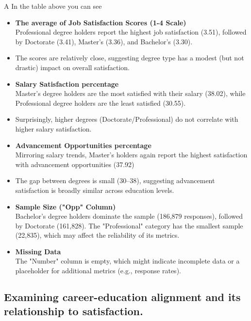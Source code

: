 \documentclass[12pt]{article}
\begin{document}
    A
In the table above you can see 
\begin{itemize}
    \item \textbf{The average of Job Satisfaction Scores (1-4 Scale)} \\
Professional degree holders report the highest job satisfaction (3.51), followed by Doctorate (3.41), Master’s (3.36), and Bachelor’s (3.30).
    \item The scores are relatively close, suggesting degree type has a modest (but not drastic) impact on overall satisfaction.
    \item\textbf{Salary Satisfaction percentage}  \\
    Master’s degree holders are the most satisfied with their salary (38.02), while Professional degree holders are the least satisfied (30.55).
    \item Surprisingly, higher degrees (Doctorate/Professional) do not correlate with higher salary satisfaction.
    \item \textbf{Advancement Opportunities percentage} \\
    Mirroring salary trends, Master’s holders again report the highest satisfaction with advancement opportunities (37.92)
    \item The gap between degrees is small (30–38), suggesting advancement satisfaction is broadly similar across education levels.
    \item \textbf{Sample Size ("Opp" Column)} \\
    Bachelor’s degree holders dominate the sample (186,879 responses), followed by Doctorate (161,828). The "Professional" category has the smallest sample (22,835), which may affect the reliability of its metrics.
    \item \textbf{Missing Data} \\
    The "Number" column is empty, which might indicate incomplete data or a placeholder for additional metrics (e.g., response rates).
 
\end{itemize}

\subsection{Examining career-education alignment and its relationship to satisfaction. }
\end{document}
